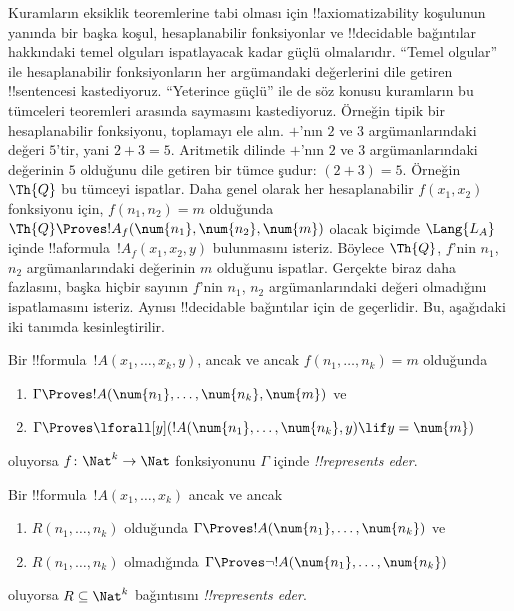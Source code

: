 \documentclass[../../../include/open-logic-section]{subfiles}
\begin{document}
Kuramların eksiklik teoremlerine tabi olması için !!{axiomatizability}
koşulunun yanında bir başka koşul, hesaplanabilir fonksiyonlar ve !!{decidable}
bağıntılar hakkındaki temel olguları ispatlayacak kadar güçlü olmalarıdır.
``Temel olgular'' ile hesaplanabilir fonksiyonların her argümandaki
değerlerini dile getiren !!{sentence}s{}i kastediyoruz. ``Yeterince güçlü''
ile de söz konusu kuramların bu tümceleri teoremleri arasında saymasını
kastediyoruz. Örneğin tipik bir hesaplanabilir fonksiyonu, toplamayı ele
alın. $+$'nın $2$ ve $3$ argümanlarındaki değeri $5$'tir, yani $2+3=5$.
Aritmetik dilinde $+$'nın $2$ ve $3$ argümanlarındaki değerinin $5$
olduğunu dile getiren bir tümce şudur: $(\num{2}+\num{3})=\num{5}$.
Örneğin $\Th{Q}$ bu tümceyi ispatlar. Daha genel olarak her hesaplanabilir
$f(x_1,x_2)$ fonksiyonu için, $f(n_1,n_2)=m$ olduğunda
$\Th{Q}\Proves !A_f(\num{n_1},\num{n_2},\num{m})$ olacak biçimde
$\Lang{L_A}$ içinde !!a{formula}~$!A_f(x_1,x_2,y)$ bulunmasını isteriz.
Böylece $\Th{Q}$, $f$'nin $n_1$, $n_2$ argümanlarındaki değerinin $m$
olduğunu ispatlar. Gerçekte biraz daha fazlasını, başka hiçbir sayının
$f$'nin $n_1$, $n_2$ argümanlarındaki değeri olmadığını ispatlamasını isteriz.
Aynısı !!{decidable} bağıntılar için de geçerlidir. Bu, aşağıdaki iki tanımda
kesinleştirilir.

\begin{defn}
Bir !!{formula}~$!A(x_1, \dots, x_k, y)$, ancak ve ancak
$f(n_1,\dots,n_k)=m$ olduğunda
\begin{enumerate}
\item $\Gamma \Proves !A(\num{n_1}, \dots, \num{n_k}, \num{m})$ ve
\item $\Gamma \Proves \lforall[y](!A(\num{n_1}, \dots, \num{n_k},
y) \lif y = \num{m})$
\end{enumerate}
oluyorsa $f\colon \Nat^k \to \Nat$ fonksiyonunu $\Gamma$ içinde
\emph{!!{represents} eder}.
\end{defn}

\begin{defn}
Bir !!{formula}~$!A(x_1, \dots, x_k)$ ancak ve ancak
\begin{enumerate}
\item $R(n_1, \dots, n_k)$ olduğunda $\Gamma \Proves !A(\num{n_1},
\dots, \num{n_k})$ ve
\item $R(n_1, \dots, n_k)$ olmadığında $\Gamma \Proves \lnot
!A(\num{n_1}, \dots, \num{n_k})$
\end{enumerate}
oluyorsa $R \subseteq \Nat^k$ bağıntısını \emph{!!{represents} eder}.
\end{defn}
\end{document}
